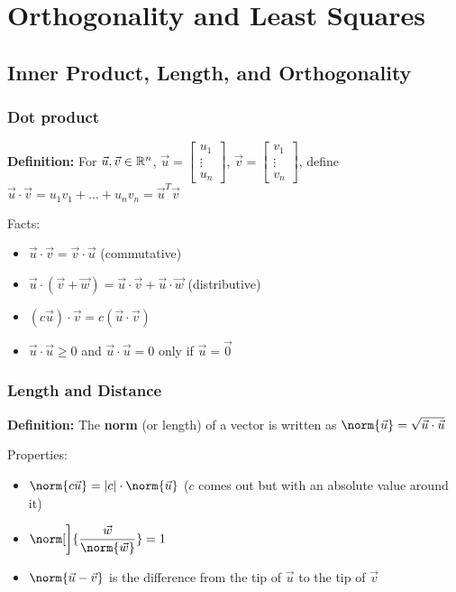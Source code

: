 \section{Orthogonality and Least Squares}

\subsection{Inner Product, Length, and Orthogonality}

\subsubsection*{Dot product}

\textbf{Definition:} For $\Vec u, \Vec v \in \mathbb{R}^n$, $\Vec u = \begin{bmatrix}u_1 \\ \vdots \\ u_n \end{bmatrix}$, $\Vec v = \begin{bmatrix}v_1 \\ \vdots \\ v_n \end{bmatrix}$, define $\Vec u \cdot \Vec v = u_1v_1 + ... + u_nv_n = \Vec u^T\Vec v$

Facts:
\begin{itemize}
    \item $\Vec u \cdot \Vec v = \Vec v \cdot \Vec u$ (commutative)
    \item $\Vec u \cdot (\Vec v + \Vec w) = \Vec u \cdot \Vec v + \Vec u \cdot \Vec w$ (distributive)
    \item $(c \Vec u)\cdot \Vec v = c(\Vec u \cdot \Vec v)$
    \item $\Vec u \cdot \Vec u \geq 0$ and $\Vec u \cdot \Vec u = 0$ only if $\Vec u = \Vec 0$
\end{itemize}

\subsubsection*{Length and Distance}

\textbf{Definition:} The \textbf{norm} (or length) of a vector is written as $\norm{\Vec u} = \sqrt{\Vec u \cdot \Vec u}$

Properties:
\begin{itemize}
    \item $\norm{c\Vec u} = |c| \cdot \norm{\Vec u}$ ($c$ comes out but with an absolute value around it)
    \item $\displaystyle \norm[\bigg]{\frac{\Vec w}{\norm{\Vec w}}} = 1$
    \item $\norm{\Vec u - \Vec v}$ is the difference from the tip of $\Vec u$ to the tip of $\Vec v$
\end{itemize}

